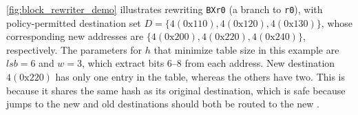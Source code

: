 
\autoref{fig:block_rewriter_demo} illustrates rewriting \texttt{BX\:r0} (a branch to \texttt{r0}),
with policy-permitted destination set $D = \{4(0\mathrm{x}110), 4(0\mathrm{x}120), 4(0\mathrm{x}130)\}$,
whose corresponding new addresses are $\{4(0\mathrm{x}200), 4(0\mathrm{x}220), 4(0\mathrm{x}240)\}$, respectively.
The parameters for $h$ that minimize table size in this example are $\mathit{lsb}=6$ and $w=3$, which extract bits 6--8 from each address.
New destination $4(0\mathrm{x}220)$ has only one entry in the table, whereas the others have two.
This is because it shares the same hash as its original destination, which is safe because jumps to the new and old destinations should both be routed to the new \Block.

